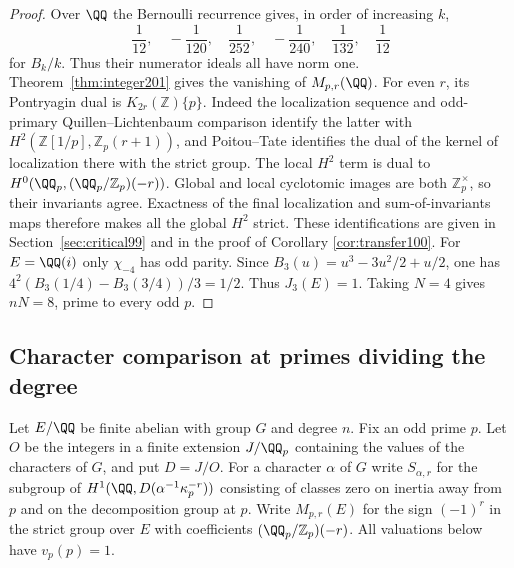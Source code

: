 \documentclass[a4paper,11pt]{article}
\theoremstyle{definition}
\theoremstyle{remark}
\newcommand{\ZZ}{\mathbb Z}\newcommand{\ord}{\operatorname{ord}}
\numberwithin{equation}{section}
\begin{document}
\begin{proof}
Over \(\QQ\) the Bernoulli recurrence gives, in order of increasing \(k\),
\[
 \frac{1}{12},\quad -\frac{1}{120},\quad \frac{1}{252},\quad
 -\frac{1}{240},\quad \frac{1}{132},\quad \frac{1}{12}
\]
for \(B_k/k\). Thus their numerator ideals all have norm one.
Theorem~\ref{thm:integer201} gives the vanishing of \(M_{p,r}(\QQ)\).
For even \(r\), its Pontryagin dual is \(K_{2r}(\ZZ)\{p\}\).
Indeed the localization sequence and odd-primary Quillen--Lichtenbaum
comparison identify the latter with \(H^2(\ZZ[1/p],\ZZ_p(r+1))\),
and Poitou--Tate identifies the dual of the kernel of localization
there with the strict group. The local \(H^2\) term is dual to
\(H^0(\QQ_p,(\QQ_p/\ZZ_p)(-r))\). Global and local cyclotomic
images are both \(\ZZ_p^\times\), so their invariants agree.
Exactness of the final localization and sum-of-invariants maps
therefore makes all the global \(H^2\) strict. These identifications
are given in Section~\ref{sec:critical99} and in the proof of
Corollary \ref{cor:transfer100}.
For \(E=\QQ(i)\) only \(\chi_{-4}\) has odd parity. Since
\(B_3(u)=u^3-3u^2/2+u/2\), one has
\(4^2(B_3(1/4)-B_3(3/4))/3=1/2\).
Thus \(J_3(E)=1\). Taking \(N=4\) gives \(nN=8\), prime to every odd \(p\).
\end{proof}

\subsection{Character comparison at primes dividing the degree}\label{nav:III-29}
Let \(E/\QQ\) be finite abelian with group \(G\) and degree \(n\).
Fix an odd prime \(p\). Let \(O\) be the integers in a finite
extension \(J/\QQ_p\) containing the values of the characters of
\(G\), and put \(D=J/O\). For a character \(\alpha\) of \(G\)
write \(S_{\alpha,r}\) for the subgroup of
\(H^1(\QQ,D(\alpha^{-1}\kappa_p^{-r}))\) consisting of classes
zero on inertia away from \(p\) and on the decomposition group at
\(p\). Write \(M_{p,r}(E)\) for the sign \((-1)^r\) in the strict
group over \(E\) with coefficients \((\QQ_p/\ZZ_p)(-r)\).
All valuations below have \(v_p(p)=1\).
\end{document}
